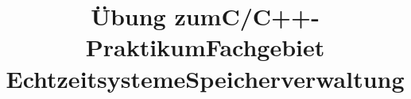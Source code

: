 

\title{Übung zum\linebreak[1]C/C++-Praktikum\linebreak[1] Fachgebiet Echtzeitsysteme\linebreak[1]\linebreak[1] Speicherverwaltung}

\setcounter{section}{4}



\maketitle

\setcounter{tocdepth}{1}
\setlength\cftsecnumwidth{10em}
\setlength\cftbeforesecskip{.1em} %



\newpage

\newpage

\newpage

\newpage

\newpage


\cclicense


